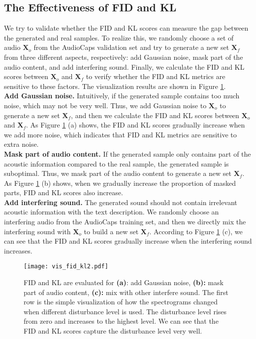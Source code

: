 \documentclass[lettersize,journal]{IEEEtran}
\begin{document}
\subsection{The Effectiveness of FID and KL}
We try to validate whether the FID and KL scores can measure the gap between the generated and real samples. To realize this, we randomly choose {\color{black}a set of} audio $\boldsymbol{X}_o$ from the AudioCaps \cite{kim2019audiocaps} validation set and try to generate a new set $\boldsymbol{X}_f$ from three different aspects, respectively: add Gaussian noise, mask part of the audio content, and add interfering sound. Finally, we calculate the FID and KL scores between $\boldsymbol{X}_o$ and $\boldsymbol{X}_f$ to verify whether the FID and KL metrics are sensitive to these factors. The visualization results are shown in Figure \ref{fig:2}. \\
\textbf{Add Gaussian noise.} Intuitively, if the generated sample contains too much noise, which may not be very well. Thus, we add Gaussian noise to $\boldsymbol{X}_o$ to generate a new set $\boldsymbol{X}_f$, and then we calculate the FID and KL scores between $\boldsymbol{X}_o$ and $\boldsymbol{X}_f$. As Figure \ref{fig:2} (a) shows, the FID and KL scores gradually increase when we add more noise, which indicates that FID and KL metrics are sensitive to extra noise. \\
\textbf{Mask part of audio content.} If the generated sample only contains part of the acoustic information compared to the real sample, the generated sample is suboptimal. Thus, we mask part of the audio content to generate a new set $\boldsymbol{X}_f$. As Figure \ref{fig:2} (b) shows, when we gradually increase the proportion of masked parts, FID and KL scores also increase. \\
\textbf{Add interfering sound.} The generated sound should not contain irrelevant acoustic information with the text description. We randomly choose an interfering audio from the AudioCaps training set, and then we directly mix the interfering sound with $\boldsymbol{X}_o$ to build a new set $\boldsymbol{X}_f$. According to Figure \ref{fig:2} (c), we can see that the FID and KL scores gradually increase when the interfering sound increases. \\
\begin{figure}[t] \label{fig:2}
  \centering
  \texttt{[image: vis\_fid\_kl2.pdf]}
  \caption{FID and KL are evaluated for \textbf{(a)}: add Gaussian noise, \textbf{(b):} mask part of audio content, \textbf{(c):} mix with other interfere sound. The first row is the simple visualization of how the spectrograms changed when different disturbance level is used. The disturbance level rises from zero and increases to the highest level. We can see that {\color{black}the} FID and KL scores capture the disturbance level very well.}
  \label{fig:2}
  \vspace*{-\baselineskip}
\end{figure}
\end{document}
